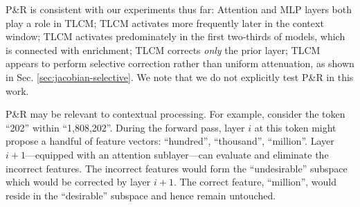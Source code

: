P\&R is consistent with our experiments thus far: Attention and MLP layers both play a role in TLCM; TLCM activates more frequently later in the context window; TLCM activates predominately in the first two-thirds of models, which is connected with enrichment; TLCM corrects \textit{only} the prior layer; TLCM appears to perform selective correction rather than uniform attenuation, as shown in Sec. \ref{sec:jacobian-selective}. We note that we do not explicitly test P\&R in this work.

P\&R may be relevant to contextual processing. For example, consider the token ``202'' within ``1,808,202''. During the forward pass, layer $i$ at this token might propose a handful of feature vectors: ``hundred'', ``thousand'', ``million''. Layer $i+1$---equipped with an attention sublayer---can evaluate and eliminate the incorrect features. The incorrect features would form the ``undesirable'' subspace which would be corrected by layer $i+1$. The correct feature, ``million'', would reside in the ``desirable'' subspace and hence remain untouched.






